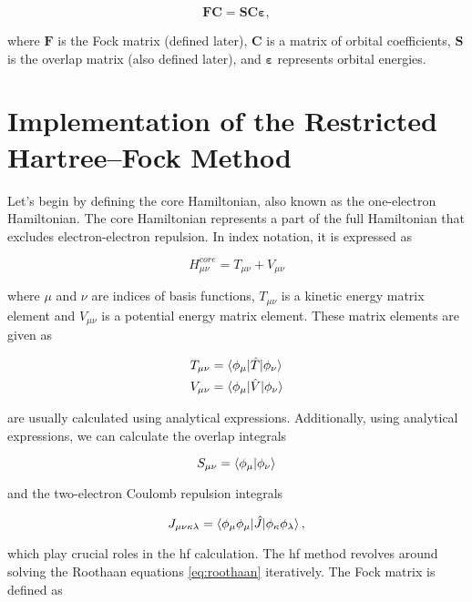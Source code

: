 \begin{equation}\label{eq:roothaan}
\mathbf{FC}=\mathbf{SC\varepsilon},
\end{equation}

where \(\mathbf{F}\) is the Fock matrix (defined later), \(\mathbf{C}\) is a matrix of orbital coefficients, \(\mathbf{S}\) is the overlap matrix (also defined later), and \(\mathbf{\varepsilon}\) represents orbital energies.

\section{Implementation of the Restricted Hartree--Fock Method}

Let's begin by defining the core Hamiltonian, also known as the one-electron Hamiltonian. The core Hamiltonian represents a part of the full Hamiltonian that excludes electron-electron repulsion. In index notation, it is expressed as

\begin{equation}\label{eq:hamiltonian}
H_{\mu\nu}^{core}=T_{\mu\nu}+V_{\mu\nu}
\end{equation}

where \(\mu\) and \(\nu\) are indices of basis functions, \(T_{\mu\nu}\) is a kinetic energy matrix element and \(V_{\mu\nu}\) is a potential energy matrix element. These matrix elements are given as

\begin{align}
T_{\mu\nu}&=\braket{\phi_{\mu}|\hat{T}|\phi_{\nu}} \\
V_{\mu\nu}&=\braket{\phi_{\mu}|\hat{V}|\phi_{\nu}}
\end{align}

are usually calculated using analytical expressions. Additionally, using analytical expressions, we can calculate the overlap integrals

\begin{equation}\label{eq:overlap}
S_{\mu\nu}=\braket{\phi_{\mu}|\phi_{\nu}}
\end{equation}

and the two-electron Coulomb repulsion integrals

\begin{equation}\label{eq:coulomb}
J_{\mu\nu\kappa\lambda}=\braket{\phi_{\mu}\phi_{\mu}|\hat{J}|\phi_{\kappa}\phi_{\lambda}},
\end{equation}

which play crucial roles in the \acrshort{hf} calculation.\cite{10.1016/S0065-3276!08!60019-2} The \acrshort{hf} method revolves around solving the Roothaan equations \ref{eq:roothaan} iteratively. The Fock matrix is defined as

